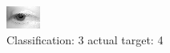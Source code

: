 \begin{figure}[h!]
\begin{center}
\includegraphics[width=0.60\columnwidth]{figures/ID2642_class_3_target_4.png}
\end{center}
\caption{ Classification: 3 actual target: 4}
\label{fig:ID2642_class_3_target_4}
\end{figure}
